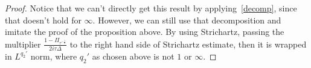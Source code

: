 \documentclass[10pt,a4paper]{article}
\newtheorem{remark}[theorem]{Remark}
\begin{document}
  \begin{proof}
    Notice that we can't directly get this result by applying~\eqref{decomp},
    since that doesn't hold for \(\infty\). However, we can still use that
    decomposition and imitate the proof of the proposition above. By using
    Strichartz, passing the multiplier \(\frac{1-\Pi_{\tau^{-\frac12}}}{2i\tau\Delta}\) 
    to the right hand side of Strichartz estimate, then it is wrapped in
    \(L^{q_2'}\) norm, where \(q_2'\) as chosen above is not \(1\) or
    \(\infty\).
  \end{proof}
  

\end{document}
